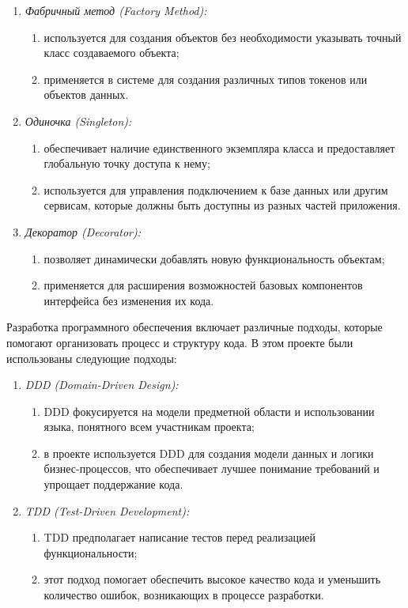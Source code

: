 \begin{enumerate}
    \item \textit{Фабричный метод (Factory Method):}
    \begin{enumerate}
        \item используется для создания объектов без необходимости указывать точный класс создаваемого объекта;
        \item применяется в системе для создания различных типов токенов или объектов данных.
    \end{enumerate}
    \item \textit{Одиночка (Singleton):}
    \begin{enumerate}
        \item обеспечивает наличие единственного экземпляра класса и предоставляет глобальную точку доступа к нему;
        \item используется для управления подключением к базе данных или другим сервисам, которые должны быть доступны из разных частей приложения.
    \end{enumerate}
    \item \textit{Декоратор (Decorator):}
    \begin{enumerate}
        \item позволяет динамически добавлять новую функциональность объектам;
        \item применяется для расширения возможностей базовых компонентов интерфейса без изменения их кода.
    \end{enumerate}
\end{enumerate}

Разработка программного обеспечения включает различные подходы, которые помогают организовать процесс и структуру кода. В этом проекте были использованы следующие подходы:

\begin{enumerate}
    \item \textit{DDD (Domain-Driven Design):}
    \begin{enumerate}
        \item DDD фокусируется на модели предметной области и использовании языка, понятного всем участникам проекта;
        \item в проекте используется DDD для создания модели данных и логики бизнес-процессов, что обеспечивает лучшее понимание требований и упрощает поддержание кода.
    \end{enumerate}
    \item \textit{TDD (Test-Driven Development):}
    \begin{enumerate}
        \item TDD предполагает написание тестов перед реализацией функциональности;
        \item этот подход помогает обеспечить высокое качество кода и уменьшить количество ошибок, возникающих в процессе разработки.
    \end{enumerate}
\end{enumerate}

